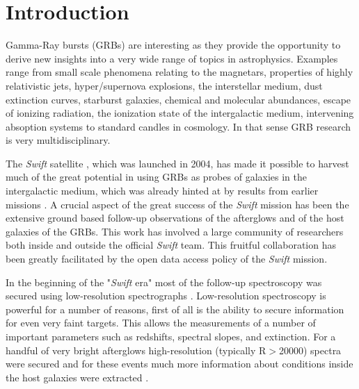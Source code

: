 \documentclass{aa}    %
\begin{document}

\maketitle

\section{Introduction}

Gamma-Ray bursts (GRBs) are interesting as they provide the opportunity to
derive new insights into a very wide range of topics in astrophysics. Examples
range from small scale phenomena relating to the magnetars, properties of highly
relativistic jets, hyper/supernova explosions, the interstellar medium, dust extinction
curves, starburst galaxies, chemical and molecular abundances, escape of ionizing 
radiation, the ionization state of the intergalactic medium, intervening
absoption systems to standard candles in cosmology.  In that sense GRB research
is very multidisciplinary. 

The {\it Swift} satellite \citep{Gehrels09}, which was launched in 2004, has
made it possible to harvest much of the great potential in using GRBs as probes
of galaxies in the intergalactic medium, which was already hinted at by results
from earlier missions \citep[e.g.][]{Ricker04}.  A crucial aspect of the great
success of the {\it Swift} mission has been the extensive ground based
follow-up observations of the afterglows and of the host galaxies of the GRBs.
This work has involved a large community of researchers both inside and outside
the official {\it Swift} team. This fruitful collaboration has been greatly
facilitated by the open data access policy of the {\it Swift} mission.

In the beginning of the "{\it Swift} era" most of the follow-up spectroscopy
was secured using low-resolution spectrographs 
\citep[typically
R=$\lambda/\Delta\lambda$$<$1000, e.g.][]{Fynbo2009}. Low-resolution
spectroscopy is powerful for a number of reasons, first of all is the ability
to secure information for even very faint targets. This allows the measurements
of a number of important parameters such as redshifts, spectral slopes,
and extinction. For
a handful of very bright afterglows high-resolution (typically R$>$20000)
spectra were secured and for these events much more information about
conditions inside the host galaxies were extracted 
\citep[e.g.,][]{Fiore,Thoene07,Prochaska07,Vreejswijk07,CastroTirado2010}. 
\end{document}
